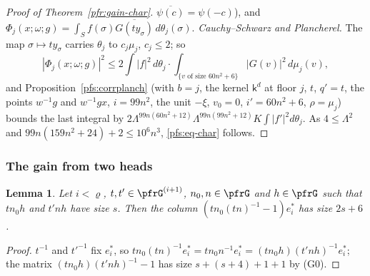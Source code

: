 \documentclass[10pt]{amsart}
\newtheorem{lemma}[theorem]{Lemma}
\theoremstyle{definition}
\theoremstyle{remark}
\begin{document}
\begin{proof}[Proof of Theorem~\ref{pfr:gain-char}]
$\overline{\psi(c)}=\psi(-c)$), and $\Phi_j(x;\omega;g)=\int_Sf(\sigma)\overline{G(ty_\sigma)}\,d\theta_j(\sigma)$. \emph{Cauchy--Schwarz and
Plancherel.} The map $\sigma\mapsto ty_\sigma$ carries $\theta_j$ to $c_j\mu_j$, $c_j\le2$; so
\[
|\Phi_j(x;\omega;g)|^2\le2\int|f|^2\,d\theta_j\cdot\int_{\{v\text{ of size }60n^2+6\}}|G(v)|^2\,d\mu_j(v),
\]
and Proposition~\ref{pfs:corrplanch} (with $b=j$, the kernel $\mathsf k^d$ at floor $j$, $t$, $q'=t$, the points $w^{-1}g$ and $w^{-1}gx$,
$i=99n^2$, the unit $-\xi$, $v_0=0$, $i'=60n^2+6$, $\rho=\mu_j$) bounds the last integral by
$2\Lambda^{99n(60n^2+12)}\Lambda^{99n(99n^2+12)}K\int|f'|^2d\theta_j$. As $4\le\Lambda^2$ and $99n(159n^2+24)+2\le10^6n^3$, \eqref{pfs:eq-char} follows.
\end{proof}

\subsubsection*{The gain from two heads}
\begin{lemma}\label{pfs:col}
Let $i<\varrho$, $t,t'\in\pfrG^{(i+1)}$, $n_0,n\in\pfrG$ and $h\in\pfrG$ such that $tn_0h$ and $t'nh$ have size $s$. Then the column
$(tn_0(tn)^{-1}-1)e_i^*$ has size $2s+6$.
\end{lemma}
\begin{proof}
$t^{-1}$ and $t'^{-1}$ fix $e_i^*$, so $tn_0(tn)^{-1}e_i^*=tn_0n^{-1}e_i^*=(tn_0h)(t'nh)^{-1}e_i^*$; the matrix $(tn_0h)(t'nh)^{-1}-1$ has size
$s+(s+4)+1+1$ by (G0).
\end{proof}
\end{document}
